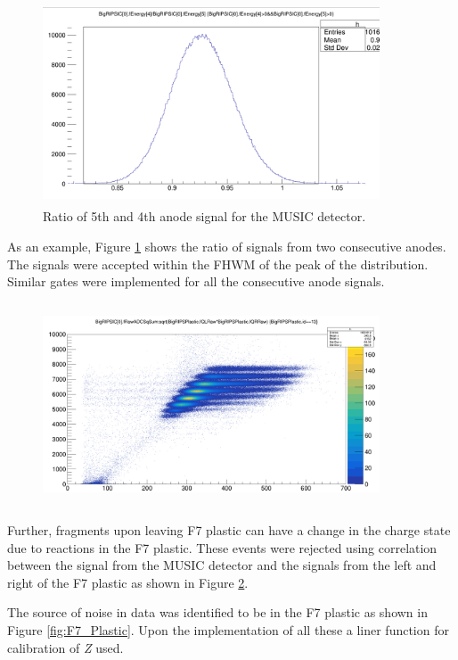 \begin{figure}[h]
	\centering
	\includegraphics[width=10cm,height=6cm]{figures/MUSIC_detector.png}
	\caption[]{Ratio of 5th and 4th anode signal for the MUSIC detector.}
	\label{fig:MUSIC_cut}
\end{figure}

As an example, Figure \ref{fig:MUSIC_cut} shows the ratio of signals from two consecutive anodes. The signals were accepted within the FHWM of the peak of the distribution. Similar gates were implemented for all the consecutive anode signals.

\begin{figure}[h]
	\centering
	\includegraphics[width=10cm,height=6cm]{figures/F7_MUSIC.png}
	\caption[]{}
	\label{fig:F7_MUSIC}
\end{figure}

Further, fragments upon leaving F7 plastic can have a change in the charge state due to reactions in the F7 plastic. These events were rejected using correlation between the signal from the MUSIC detector and the signals from the left and right of the F7 plastic as shown in Figure \ref{fig:F7_MUSIC}.




The source of noise in data was identified to be in the F7 plastic as shown in Figure \ref{fig:F7_Plastic}. Upon the implementation of all these a liner function for calibration of \textit{Z} used. 


